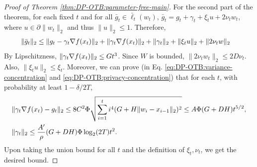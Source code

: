 \begin{proof}[Proof of Theorem \ref{thm:DP-OTB:parameter-free-main}]
For the second part of the theorem, for each fixed $t$ and for all $\bar g_t\in \bar\ell_t(w_t)$, $\bar g_t = g_t+\gamma_t + \xi_t u+ 2\nu_t w_t$, where $u\in \partial \|w_t\|_2$ and thus $\|u\|_2 \leq 1$. Therefore,
\begin{align*}
    \|\bar g_t\|_2
    &\leq \| g_t - \gamma_t\nabla f(x_t)\|_2 + \|\gamma_t\nabla f(x_t)\|_2 + \|\gamma_t\|_2 + \|\xi_t u\|_2 + \|2\nu_tw \|_2
\end{align*}
By Lipschitzness, $\|\gamma_t\nabla f(x_t)\|_2 \leq Gt^3$. Since $W$ is bounded, $\|2\nu_tw_t\|_2\leq 2D\nu_t$. Also, $\|\xi_tu\|_2\leq \xi_t$. Moreover, we can prove (in Eq. \ref{eq:DP-OTB:variance-concentration} and \ref{eq:DP-OTB:privacy-concentration}) that for each $t$, with probability at least $1-\delta/2T$,
\begin{align*}
    & \|\gamma_t\nabla f(x_t) - g_t\|_2
    \leq 8C^2\Phi \sqrt{\sum_{i=1}^t i^4(G+H\|w_i-x_{i-1}\|_2)^2} 
    \leq A\Phi (G+DH) t^{5/2}, \\
    & \|\gamma_t\|_2 \leq \frac{A'}{\rho}(G+DH)\Phi \log_2(2T)t^2.
\end{align*}
Upon taking the union bound for all $t$ and  the definition of $\xi_t,\nu_t$, we get the desired bound.
\end{proof}